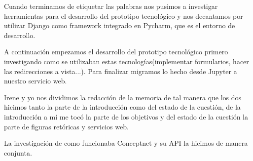 Cuando terminamos de etiquetar las palabras nos pusimos a investigar herramientas para el desarrollo del prototipo tecnológico y nos decantamos por utilizar Django como framework integrado en Pycharm, que es el entorno de desarrollo.

A continuación empezamos el desarrollo del prototipo tecnológico primero investigando como se utilizaban estas tecnologías(implementar formularios, hacer las redirecciones a vista...). Para finalizar migramos lo hecho desde Jupyter a nuestro servicio web. \newline

Irene y yo nos dividimos la redacción de la memoria de tal manera que los dos hicimos tanto la parte de la introducción como del estado de la cuestión, de la introducción a mí me tocó la parte de los objetivos y del estado de la cuestión la parte de figuras retóricas y servicios web. \newline

La investigación de como funcionaba Conceptnet y su API la hicimos de manera conjunta.

